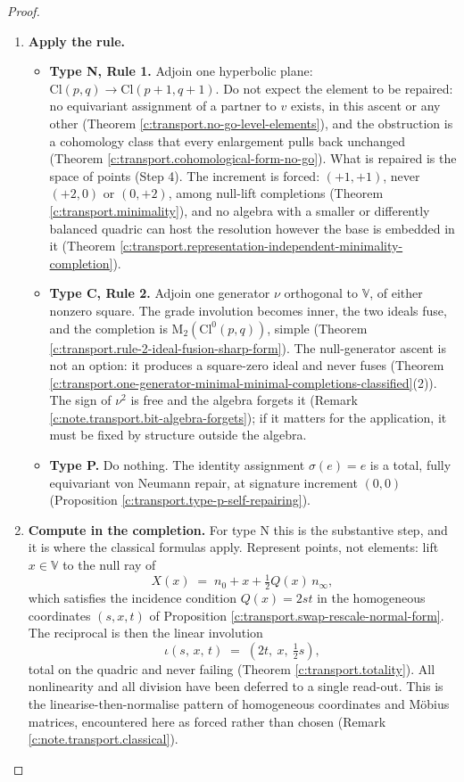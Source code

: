 \documentclass[11pt]{article}
\theoremstyle{definition}
\theoremstyle{plain}
\providecommand{\Cl}{}\renewcommand{\Cl}{\mathrm{Cl}}
\providecommand{\Mat}{}\renewcommand{\Mat}{\mathrm{M}}
\providecommand{\nInf}{}\renewcommand{\nInf}{n_\infty}
\providecommand{\nO}{}\renewcommand{\nO}{n_0}
\begin{document}
\begin{proof}
\begin{enumerate}
\item[\textbf{Step 3.}] \textbf{Apply the rule.}
  \begin{itemize}
  \item \textbf{Type N, Rule 1.} Adjoin one hyperbolic plane: $\Cl(p,q) \to \Cl(p{+}1,q{+}1)$. Do not expect the element to be repaired: no equivariant assignment of a partner to $v$ exists, in this ascent or any other (Theorem \ref{c:transport.no-go-level-elements}), and the obstruction is a cohomology class that every enlargement pulls back unchanged (Theorem \ref{c:transport.cohomological-form-no-go}). What is repaired is the space of points (Step 4). The increment is forced: $(+1,+1)$, never $(+2,0)$ or $(0,+2)$, among null-lift completions (Theorem \ref{c:transport.minimality}), and no algebra with a smaller or differently balanced quadric can host the resolution however the base is embedded in it (Theorem \ref{c:transport.representation-independent-minimality-completion}).
  \item \textbf{Type C, Rule 2.} Adjoin one generator $\nu$ orthogonal to $\mathbb{V}$, of either nonzero square. The grade involution becomes inner, the two ideals fuse, and the completion is $\Mat_2(\Cl^0(p,q))$, simple (Theorem \ref{c:transport.rule-2-ideal-fusion-sharp-form}). The null-generator ascent is not an option: it produces a square-zero ideal and never fuses (Theorem \ref{c:transport.one-generator-minimal-minimal-completions-classified}(2)). The sign of $\nu^2$ is free and the algebra forgets it (Remark \ref{c:note.transport.bit-algebra-forgets}); if it matters for the application, it must be fixed by structure outside the algebra.
  \item \textbf{Type P.} Do nothing. The identity assignment $\sigma(e) = e$ is a total, fully equivariant von Neumann repair, at signature increment $(0,0)$ (Proposition \ref{c:transport.type-p-self-repairing}).
  \end{itemize}

\item[\textbf{Step 4.}] \textbf{Compute in the completion.} For type N this is the substantive step, and it is where the classical formulas apply. Represent points, not elements: lift $x \in \mathbb{V}$ to the null ray of
  \[
  X(x) \;=\; \nO + x + \tfrac12 Q(x)\,\nInf ,
  \]
  which satisfies the incidence condition $Q(x) = 2st$ in the homogeneous coordinates $(s,x,t)$ of Proposition \ref{c:transport.swap-rescale-normal-form}. The reciprocal is then the linear involution
  \[
  \iota(s,\,x,\,t) \;=\; (2t,\ x,\ \tfrac12 s),
  \]
  total on the quadric and never failing (Theorem \ref{c:transport.totality}). All nonlinearity and all division have been deferred to a single read-out. This is the linearise-then-normalise pattern of homogeneous coordinates and M\"obius matrices, encountered here as forced rather than chosen (Remark \ref{c:note.transport.classical}).


\end{enumerate}
\end{proof}
\end{document}
